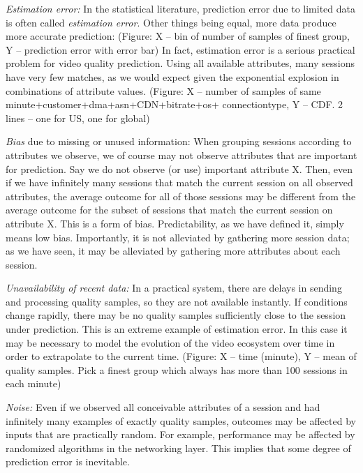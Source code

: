 \begin{packedenumerate}
  \item \emph{Estimation error:} In the statistical literature, prediction error due to limited data is often called {\it estimation error}.  Other things being equal, more data produce more accurate prediction: (Figure: X -- bin of number of samples of finest group, Y -- prediction error with error bar)  In fact, estimation error is a serious practical problem for video quality prediction.  Using all available attributes, many sessions have very few matches, as we would expect given the exponential explosion in combinations of attribute values.  (Figure: X -- number of samples of same minute+customer+dma+asn+CDN+bitrate+os+ connectiontype, Y -- CDF. 2 lines -- one for US, one for global)
  \item \emph{Bias} due to missing or unused information: When grouping sessions according to attributes we observe, we of course may not observe attributes that are important for prediction.  Say we do not observe (or use) important attribute X.  Then, even if we have infinitely many sessions that match the current session on all observed attributes, the average outcome for all of those sessions may be different from the average outcome for the subset of sessions that match the current session on attribute X.  This is a form of bias.  Predictability, as we have defined it, simply means low bias.  Importantly, it is not alleviated by gathering more session data; as we have seen, it may be alleviated by gathering more attributes about each session.
  \item \emph{Unavailability of recent data:} In a practical system, there are delays in sending and processing quality samples, so they are not available instantly.  If conditions change rapidly, there may be no quality samples sufficiently close to the session under prediction.  This is an extreme example of estimation error.  In this case it may be necessary to model the evolution of the video ecosystem over time in order to extrapolate to the current time.
  (Figure: X -- time (minute), Y -- mean of quality samples. Pick a finest group which always has more than 100 sessions in each minute)
  \item \emph{Noise:} Even if we observed all conceivable attributes of a session and had infinitely many examples of exactly quality samples, outcomes may be affected by inputs that are practically random.  For example, performance may be affected by randomized algorithms in the networking layer.  This implies that some degree of prediction error is inevitable.
\end{packedenumerate}

